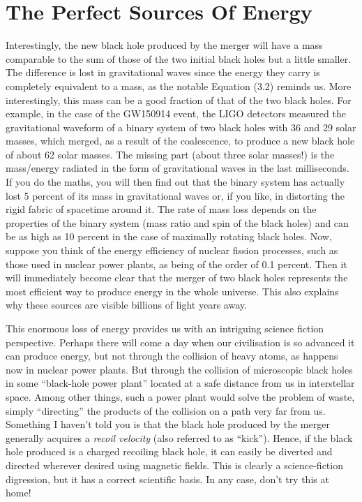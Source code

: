 \section{The Perfect Sources Of Energy}\label{sec:08-energy}

Interestingly, the new black hole produced by the merger will have a mass comparable to
the sum of those of the two initial black holes but a little smaller. The difference is
lost in gravitational waves since the energy they carry is completely equivalent to a
mass, as the notable Equation (3.2) reminds us. More interestingly, this mass can be a
good fraction of that of the two black holes. For example, in the case of the
GW150914 event, the LIGO detectors measured the gravitational
waveform of a binary system of two black holes with 36 and 29 solar masses, which
merged, as a result of the coalescence, to produce a new black hole of about 62 solar
masses. The missing part (about three solar masses!) is the mass/energy radiated in the
form of gravitational waves in the last milliseconds. If you do the maths, you will then
find out that the binary system has actually lost 5 percent of its mass in gravitational
waves or, if you like, in distorting the rigid fabric of spacetime around it. The rate
of mass loss depends on the properties of the binary system (mass ratio and spin of the
black holes) and can be as high as 10 percent in the case of maximally rotating black
holes. Now, suppose you think of the energy efficiency of nuclear
fission processes, such as those used in nuclear power plants, as being of the order of
0.1 percent. Then it will immediately become clear that the merger of two black holes
represents the most efficient way to produce energy in the whole universe. This also
explains why these sources are visible billions of light years away.

This enormous loss of energy provides us with an intriguing science fiction perspective.
Perhaps there will come a day when our civilisation is so advanced it can produce
energy, but not through the collision of heavy atoms, as happens now in nuclear power
plants. But through the collision of microscopic black holes in some
``black-hole power plant'' located at a safe distance from us in
interstellar space. Among other things, such a power plant would solve the problem of
waste, simply ``directing'' the products of the collision on a path very far from us.
Something I haven't told you is that the black hole produced by the merger generally
acquires a \emph{recoil velocity} (also referred to as ``kick'').
Hence, if the black hole produced is a charged recoiling black hole, it can easily be
diverted and directed wherever desired using magnetic fields. This is clearly a
science-fiction digression, but it has a correct scientific basis. In any case, don't
try this at home!

